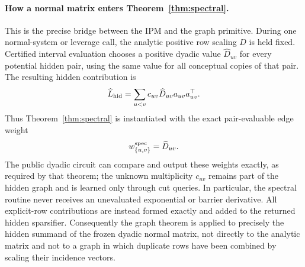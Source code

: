 \documentclass[11pt]{article}
\theoremstyle{definition}
\begin{document}
\paragraph{How a normal matrix enters Theorem~\ref{thm:spectral}.}
This is the precise bridge between the IPM and the graph primitive.  During
one normal-system or leverage call, the analytic positive row scaling $D$ is
held fixed.  Certified interval evaluation chooses a positive dyadic value
$\widehat D_{uv}$ for every potential hidden pair, using the same value for
all conceptual copies of that pair.  The resulting hidden contribution is
\[
 \widehat L_{\rm hid}
   =\sum_{u<v}c_{uv}\widehat D_{uv}
      a_{uv}a_{uv}^\top .
\]
Thus Theorem~\ref{thm:spectral} is instantiated with the exact
pair-evaluable edge weight
\[
        w_{\{u,v\}}^{\rm spec}=\widehat D_{uv}.
\]
The public dyadic circuit can compare and output these weights exactly, as
required by that theorem; the unknown multiplicity $c_{uv}$ remains part of
the hidden graph and is learned only through cut queries.  In particular, the
spectral routine never receives an unevaluated exponential or barrier
derivative.  All explicit-row contributions are instead formed exactly and
added to the returned hidden sparsifier.  Consequently the graph theorem is
applied to precisely the hidden summand of the frozen dyadic normal matrix,
not directly to the analytic matrix and not to a graph in which duplicate
rows have been combined by scaling their incidence vectors.
\end{document}
